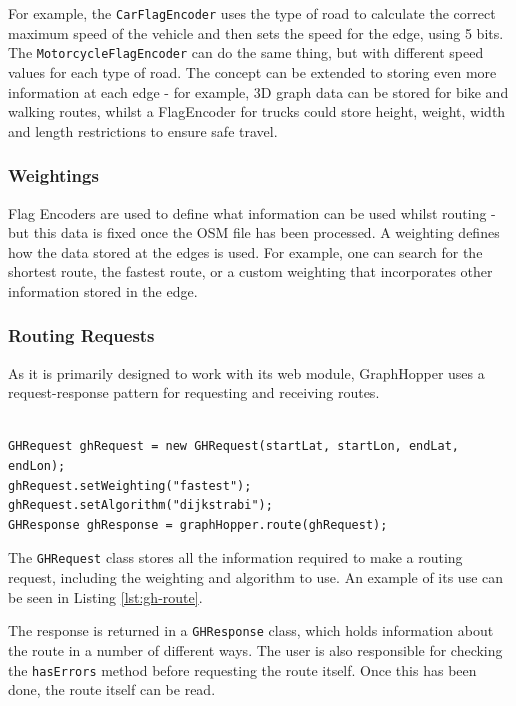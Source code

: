 \documentclass[ %
                    author={Alexander Hill},
                supervisor={Dr. Benjamin Sach},
                    degree={MEng},
                     title={MARMOSET},
                  subtitle={Multi-Agent Route Management using Online Simulation for Efficient Transportation},
                      type={research},
                      year={2016} ]{dissertation}
\begin{document}
For example, the \texttt{CarFlagEncoder} uses the type of road to calculate the
correct maximum speed of the vehicle and then sets the speed for the edge, using
5 bits. The \texttt{MotorcycleFlagEncoder} can do the same thing, but with
different speed values for each type of road. The concept can be extended to
storing even more information at each edge - for example, 3D graph data can be
stored for bike and walking routes, whilst a FlagEncoder for trucks could store
height, weight, width and length restrictions to ensure safe travel.

\subsubsection{Weightings}

Flag Encoders are used to define what information can be used whilst routing -
but this data is fixed once the OSM file has been processed. A weighting defines
how the data stored at the edges is used. For example, one can search for the
shortest route, the fastest route, or a custom weighting that incorporates other
information stored in the edge.

\subsubsection{Routing Requests}

As it is primarily designed to work with its web module, GraphHopper uses a
request-response pattern for requesting and receiving routes.

\begin{lstlisting}[label=lst:gh-route,caption={GraphHopper request and response}]

GHRequest ghRequest = new GHRequest(startLat, startLon, endLat, endLon);
ghRequest.setWeighting("fastest");
ghRequest.setAlgorithm("dijkstrabi");
GHResponse ghResponse = graphHopper.route(ghRequest);

\end{lstlisting}

The \texttt{GHRequest} class stores all the information required to make a
routing request, including the weighting and algorithm to use. An example of its
use can be seen in Listing \ref{lst:gh-route}.

The response is returned in a \texttt{GHResponse} class, which holds information
about the route in a number of different ways. The user is also responsible for
checking the \texttt{hasErrors} method before requesting the route itself.  Once
this has been done, the route itself can be read.
\end{document}
